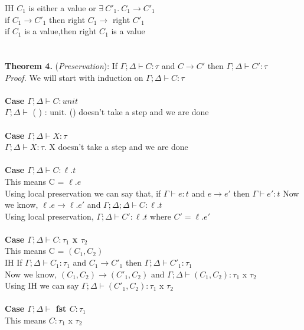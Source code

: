 \documentclass{article}
\begin{document}
IH $C_1$ is either a value or $  \exists \ C'_1.\ C_1 \to C'_1 $ \\
if $C_1 \to C'_1$ then right $C_1 \to$ right $C'_1$\\
if $C_1$ is a value,then right $C_1$ is a value\\ \\
\\
\textbf{Theorem 4.} (\textit{Preservation}): If $\Gamma;\Delta \vdash C : \tau$ and  $C \to C'$ then $\Gamma;\Delta \vdash C' : \tau$
  \\
\textit{Proof.} We will start with induction on $\Gamma;\Delta \vdash C : \tau$ \\ \\
\textbf{Case $\Gamma; \Delta \vdash C : unit$} \\
 $\Gamma; \Delta \vdash $ ( ) : unit. () doesn't take a step and we are done \\ \\
\textbf{Case $\Gamma; \Delta \vdash X : \tau$}       \\ 
$\Gamma; \Delta \vdash X : \tau$. X doesn't take a step and we are done \\ \\
\textbf{Case $\Gamma; \Delta \vdash C : \ell.t$}       \\ 
This means C = $\ell.e$ \\
Using local preservation we can say that, if $\Gamma \vdash e : t$ and  $e \to e'$ then $\Gamma \vdash e' : t$
Now we know, $\ell.e \to \ell.e'$ and $\Gamma; \Delta; \Delta \vdash C : \ell.t$  \\
Using local preservation, $\Gamma;\Delta \vdash C' : \ell.t$ where $C' = \ell.e'$
\\ \\
\textbf{Case $\Gamma;\Delta \vdash C : \tau_1 $ x $ \tau_2$ } \\
This means C = $(C_1, C_2)$ \\
IH If $\Gamma; \Delta \vdash C_1 : \tau_1$ and  $C_1 \to C'_1$ then $\Gamma;\Delta \vdash C'_1 : \tau_1$ \\
Now we know, $(C_1,C_2) \to (C'_1, C_2)$ and $\Gamma; \Delta \vdash (C_1, C_2) : \tau_1$ x $\tau_2$ \\
Using IH we can say $\Gamma;\Delta \vdash (C'_1, C_2) : \tau_1$ x $ \tau_2$ \\\\
\textbf{Case $\Gamma; \Delta\vdash$ fst $C : \tau_1$ } \\
This means $C : \tau_1$ x $\tau_2$ \\
\end{document}
